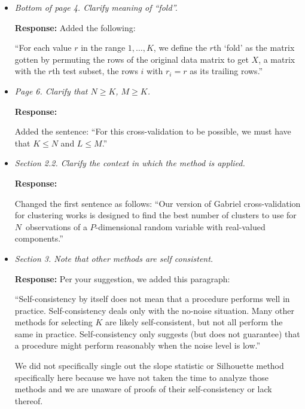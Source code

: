 \documentclass[11pt]{article}
\begin{document}
\begin{itemize}

\item \textit{Bottom of page 4. Clarify meaning of ``fold''.}

\textbf{Response:} Added the following:

``For each value $r$ in the range $1, \dotsc, K$, we define the $r$th `fold'
as the matrix gotten by permuting the rows of the original data matrix to get
$X$, a matrix with the $r$th test subset, the rows $i$ with $r_i = r$ as
its trailing rows.''


\item \textit{Page 6. Clarify that $N \geq K$, $M \geq K$.}

\textbf{Response:} 

Added the sentence: ``For this cross-validation to be possible, we must have that
$K \leq N$ and $L \leq M$.''

%
%


\item \textit{Section 2.2. Clarify the context in which the method is applied.}

\textbf{Response:} 

Changed the first sentence as follows: ``Our version of Gabriel
cross-validation for clustering works is designed to find the best number of
clusters to use for $N$~observations of a $P$-dimensional random variable with
real-valued components.''


\item \textit{Section 3. Note that other methods are self consistent.}

\textbf{Response:} Per your suggestion, we added this paragraph:

``Self-consistency by itself does not mean that a procedure performs well in
practice. Self-consistency deals only with the no-noise situation.  Many other
methods for selecting $K$ are likely self-consistent, but not all perform the
same in practice. Self-consistency only suggests (but does not guarantee) that
a procedure might perform reasonably when the noise level is low.''

We did not specifically single out the slope statistic or Silhouette method
specifically here because we have not taken the time to analyze those methods
and we are unaware of proofs of their self-consistency or lack thereof.



\end{itemize}
\end{document}
